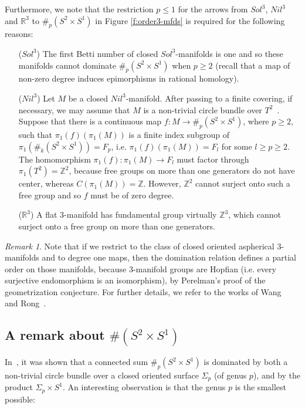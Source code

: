 \documentclass[12pt]{amsart}
\theoremstyle{remark}
\newtheorem{rem}[thm]{Remark}
\begin{document}
Furthermore, we note that the restriction $p \leq 1$ for the arrows from $Sol^3$, $Nil^3$ and ${\mathbb{R}}^3$ to $\#_p (S^2 \times S^1)$ in Figure
\ref{f:order3-mfds} is required for the following reasons:
\begin{itemize}
 \item[($Sol^3$)] The first Betti number of closed $Sol^3$-manifolds is one and so these manifolds cannot dominate $\#_p (S^2 \times S^1)$ when $p \geq 2$ (recall that a map of non-zero degree induces epimorphisms in rational homology).
 \item[($Nil^3$)] Let $M$ be a closed $Nil^3$-manifold. After passing to a finite covering, if necessary, we may assume that $M$ is a non-trivial circle bundle over $T^2$~\cite{Scott:3-mfds}. Suppose that there is a continuous map $f \colon M \longrightarrow \#_p (S^2 \times S^1)$, where $p \geq 2$, such that
$\pi_1(f)(\pi_1(M))$ is a finite index
subgroup of $\pi_1(\#_k(S^2\times S^1))=F_p$, i.e. $\pi_1(f)(\pi_1(M)) = F_l$ for some $l\geq p\geq 2$. The homomorphism $\pi_1(f) \colon \pi_1(M) \longrightarrow F_l$ must factor
through $\pi_1(T^2) = {\mathbb{Z}}^2$, because free groups on more than one generators do not have center, whereas $C(\pi_1(M))={\mathbb{Z}}$. However, ${\mathbb{Z}}^2$ cannot surject
onto such a free group and so $f$ must be of zero degree.
\item[(${\mathbb{R}}^3$)] A flat $3$-manifold has fundamental group virtually ${\mathbb{Z}}^3$, which cannot surject onto a free group on more than one generators.
\end{itemize}

\begin{rem}
Note that if we restrict to the class of closed oriented aspherical $3$-manifolds and to degree one maps, then the domination
relation defines a partial order on those manifolds, because $3$-manifold groups are Hopfian 
(i.e. every surjective endomorphism is an isomorphism), by Perelman's proof of the geometrization conjecture. For further details, we refer to the works of
Wang~\cite{Wang:3-mfdsasp,Wang:inj} and Rong~\cite{Rong}. 
\end{rem}

\subsection{A remark about $\#(S^2\times S^1)$}
In~\cite{KotschickNeofytidis}, it was shown that a connected sum $\#_p(S^2\times S^1)$ is dominated by both a non-trivial circle bundle over a closed oriented surface $\Sigma_p$ (of genus $p$), and by the product $\Sigma_p\times S^1$. An interesting observation is that the genus $p$ is the smallest possible:
\end{document}
